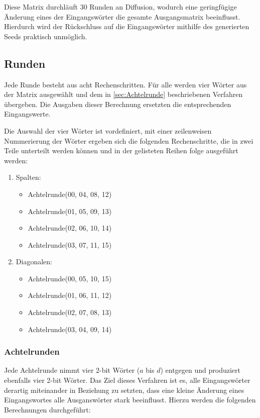 \documentclass[10pt,a4paper]{article}
\begin{document}
Diese Matrix durchläuft 30 Runden an Diffusion, wodurch eine geringfügige Änderung eines der Eingangswörter die gesamte Ausgangsmatrix beeinflusst.
Hierdurch wird der Rückschluss auf die Eingangswörter mithilfe des generierten Seeds praktisch unmöglich.

\subsection{Runden}

Jede Runde besteht aus acht Rechenschritten.
Für alle werden vier Wörter aus der Matrix ausgewählt und dem in \autoref{sec:Achtelrunde} beschriebenen Verfahren übergeben.
Die Ausgaben dieser Berechnung ersetzten die entsprechenden Eingangswerte.

Die Auswahl der vier Wörter ist vordefiniert, mit einer zeilenweisen Nummerierung der Wörter ergeben sich die folgenden Rechenschritte, die in zwei Teile unterteilt werden können und in der gelisteten Reihen folge ausgeführt werden:
\begin{enumerate}
    \item Spalten:
          \begin{itemize}
              \item Achtelrunde(00, 04, 08, 12)
              \item Achtelrunde(01, 05, 09, 13)
              \item Achtelrunde(02, 06, 10, 14)
              \item Achtelrunde(03, 07, 11, 15)
          \end{itemize}
    \item Diagonalen:
          \begin{itemize}
              \item Achtelrunde(00, 05, 10, 15)
              \item Achtelrunde(01, 06, 11, 12)
              \item Achtelrunde(02, 07, 08, 13)
              \item Achtelrunde(03, 04, 09, 14)
          \end{itemize}
\end{enumerate}

\subsubsection{Achtelrunden}
\label{sec:Achtelrunde}

Jede Achtelrunde nimmt vier 2-bit Wörter ($a$ bis $d$) entgegen und produziert ebenfalls vier 2-bit Wörter.
Das Ziel dieses Verfahren ist es, alle Eingangswörter derartig miteinander in Beziehung zu setzten, dass eine kleine Änderung eines Eingangswortes alle Ausganswörter stark beeinflusst.
Hierzu werden die folgenden Berechnungen durchgeführt:
\end{document}
